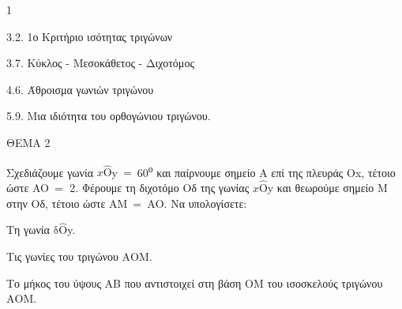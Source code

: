 \begin{ylh}{1}
    \item 3.2. 1ο Κριτήριο ισότητας τριγώνων
    \item 3.7. Κύκλος - Μεσοκάθετος - Διχοτόμος
    \item 4.6. Άθροισμα γωνιών τριγώνου
    \item 5.9. Μια ιδιότητα του ορθογώνιου τριγώνου.
\end{ylh}

ΘΕΜΑ 2

Σχεδιάζουμε γωνία $x\widehat{\text{O}}$y$\  = \ $60\textsuperscript{ο} και παίρνουμε σημείο Α επί της πλευράς Οx, τέτοιο ώστε AO$\  =$ 2. Φέρουμε τη διχοτόμο Οδ της γωνίας $x\widehat{\text{O}}$y και θεωρούμε σημείο Μ στην Οδ, τέτοιο ώστε AΜ$\  = \ $ΑΟ. Να υπολογίσετε:

\begin{alist}
\item Τη γωνία $\text{δ}\widehat{\text{O}}$y.


\item Τις γωνίες του τριγώνου ΑΟΜ.


\item Το μήκος του ύψους ΑB που αντιστοιχεί στη βάση ΟΜ του ισοσκελούς τριγώνου ΑΟΜ.



\end{alist}
